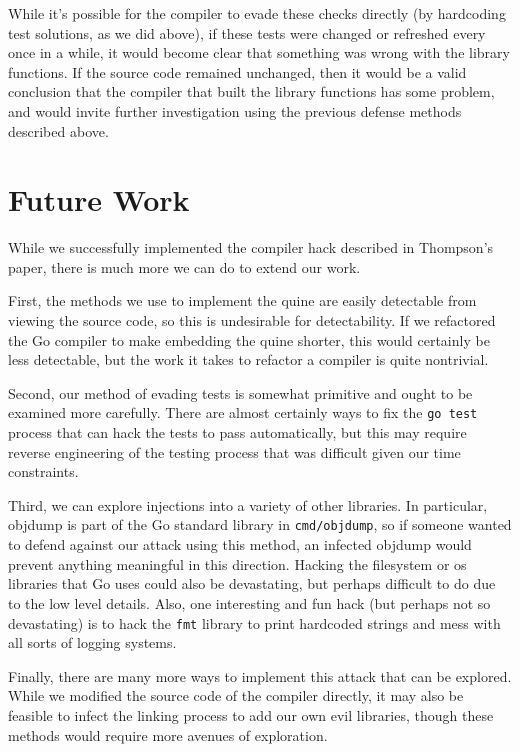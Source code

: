 \documentclass[10pt]{sigplanconf}
\begin{document}
\smallskip

While it's possible for the compiler to evade these checks directly (by hardcoding test solutions, as we did above), if these tests were changed or refreshed every once in a while, it would become clear that something was wrong with the library functions. If the source code remained unchanged, then it would be a valid conclusion that the compiler that built the library functions has some problem, and would invite further investigation using the previous defense methods described above.

\section{Future Work}
While we successfully implemented the compiler hack described in Thompson's paper, there is much more we can do to extend our work. 

\smallskip

First, the methods we use to implement the quine are easily detectable from viewing the source code, so this is undesirable for detectability. If we refactored the Go compiler to make embedding the quine shorter, this would certainly be less detectable, but the work it takes to refactor a compiler is quite nontrivial.

\smallskip

Second, our method of evading tests is somewhat primitive and ought to be examined more carefully. There are almost certainly ways to fix the \texttt{go test} process that can hack the tests to pass automatically, but this may require reverse engineering of the testing process that was difficult given our time constraints.

\smallskip

Third, we can explore injections into a variety of other libraries. In particular, objdump is part of the Go standard library in \texttt{cmd/objdump}, so if someone wanted to defend against our attack using this method, an infected objdump would prevent anything meaningful in this direction. Hacking the filesystem or os libraries that Go uses could also be devastating, but perhaps difficult to do due to the low level details. Also, one interesting and fun hack (but perhaps not so devastating) is to hack the \texttt{fmt} library to print hardcoded strings and mess with all sorts of logging systems.

\smallskip

Finally, there are many more ways to implement this attack that can be explored. While we modified the source code of the compiler directly, it may also be feasible to infect the linking process to add our own evil libraries, though these methods would require more avenues of exploration.
\end{document}
